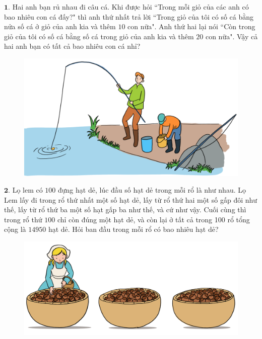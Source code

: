 \begin{multicols}{2}
	$\pmb{1.}$ Hai anh bạn rủ nhau đi câu cá. Khi được hỏi ``Trong mỗi giỏ của các anh có bao nhiêu con cá đấy?" thì anh thứ nhất trả lời ``Trong giỏ của tôi có số cá bằng nửa số cá ở giỏ của anh kia và thêm $10$ con nữa". Anh thứ hai lại nói ``Còn trong giỏ của tôi có số cá bằng số cá trong giỏ của anh kia và thêm $20$ con nữa". Vậy cả hai anh bạn có tất cả bao nhiêu con cá nhỉ? 
	\begin{figure}[H]
		\centering
		\vspace*{-10pt}
		\captionsetup{labelformat= empty, justification=centering}
		\includegraphics[width=1\linewidth]{Pi10_ToanBi_Bai1}
		\vspace*{-15pt}
	\end{figure}
	\vskip 0.1cm
	$\pmb{2.}$ Lọ lem có $100$  đựng hạt dẻ, lúc đầu số hạt dẻ trong mỗi rổ là như nhau. Lọ Lem lấy đi trong rổ thứ nhất một số hạt dẻ, lấy từ rổ  thứ hai một số gấp đôi như thế, lấy từ rổ thứ ba một số hạt gấp ba như thế, và cứ như vậy. Cuối cùng thì trong rổ thứ $100$ chỉ còn đúng một hạt dẻ, và còn lại ở tất cả trong 100 rổ tổng cộng là $14950$ hạt dẻ. Hỏi ban đầu trong mỗi rổ có bao nhiêu hạt dẻ?
	\begin{figure}[H]
		\centering
		\vspace*{-10pt}
		\captionsetup{labelformat= empty, justification=centering}
		\includegraphics[width=1\linewidth]{Pi10_ToanBi_Bai2}

\end{figure}
\end{multicols}
